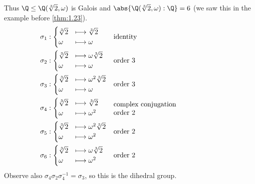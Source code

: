 \documentclass{article}
\begin{document}
\begin{eg}
\begin{enumerate}[label=(\arabic*)]
            Thus $\Q \leq \Q(\sqrt[3]{2}, \omega)$ is Galois and $\abs{\Q(\sqrt[3]{2}, \omega):\Q} = 6$ (we saw this in the example before \cref{thm:1.23}).
            \begin{align*}
                \sigma_1&:
                    \begin{cases}
                        \sqrt[3]{2} &\longmapsto \sqrt[3]{2} \\ \omega &\longmapsto \omega
                    \end{cases}
                    &&\text{identity} \\
                \sigma_2&:
                    \begin{cases}
                        \sqrt[3]{2} &\longmapsto \omega\sqrt[3]{2} \\ \omega &\longmapsto \omega
                    \end{cases}
                    &&\text{order } 3 \\
                \sigma_3&:
                    \begin{cases}
                        \sqrt[3]{2} &\longmapsto \omega^2\sqrt[3]{2} \\ \omega &\longmapsto \omega
                    \end{cases}
                    &&\text{order } 3 \\
                \sigma_4&:
                    \begin{cases}
                        \sqrt[3]{2} &\longmapsto \sqrt[3]{2} \\ \omega &\longmapsto \omega^2
                    \end{cases}
                    &&\parbox{15em}{complex conjugation\\ order $2$} \\
                \sigma_5&:
                    \begin{cases}
                        \sqrt[3]{2} &\longmapsto \omega^2\sqrt[3]{2} \\ \omega &\longmapsto \omega^2
                    \end{cases}
                    &&\text{order } 2 \\
                \sigma_6&:
                    \begin{cases}
                        \sqrt[3]{2} &\longmapsto \omega\sqrt[3]{2} \\ \omega &\longmapsto \omega^2
                    \end{cases}
                    &&\text{order } 2
            \end{align*}
            Observe also $\sigma_4 \sigma_2 \sigma_4^{-1} = \sigma_3$, so this is the dihedral group.
    \end{enumerate}
\end{eg}
\end{document}
